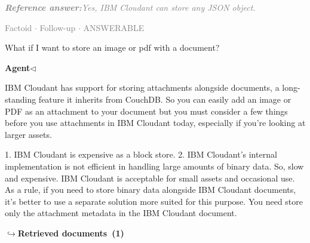 \documentclass[a4paper,11pt]{article}
\begin{document}
\begin{refanswerenv}
{\footnotesize\textit{\textcolor{gray}{\textbf{Reference answer:}\enspace Yes, IBM Cloudant can store any JSON object.}}}
\end{refanswerenv}
\vspace{0.5em}
\hfill{\tiny\textcolor{gray}{Factoid $\cdot$ Follow-up $\cdot$ ANSWERABLE}}
\begin{userbubble}
What if I want to store an image or pdf with a document? 
\end{userbubble}
\noindent\hfill{\small\textcolor{agentcolor}{\textbf{Agent\enspace$\triangleleft$}}}
\begin{agentbubble}
IBM Cloudant has support for storing attachments alongside documents, a long-standing feature it inherits from CouchDB. So you can easily add an image or PDF as an attachment to your document but you must consider a few things before you use attachments in IBM Cloudant today, especially if you’re looking at larger assets.

1. IBM Cloudant is expensive as a block store.
2. IBM Cloudant’s internal implementation is not efficient in handling large amounts of binary data. So, slow and expensive. IBM Cloudant is acceptable for small assets and occasional use. As a rule, if you need to store binary data alongside IBM Cloudant documents, it’s better to use a separate solution more suited for this purpose. You need store only the attachment metadata in the IBM Cloudant document.
\end{agentbubble}
\noindent\hfill{\footnotesize\textcolor{doccolor}{\textbf{$\hookrightarrow$\enspace Retrieved documents~(1)}}}
\end{document}
